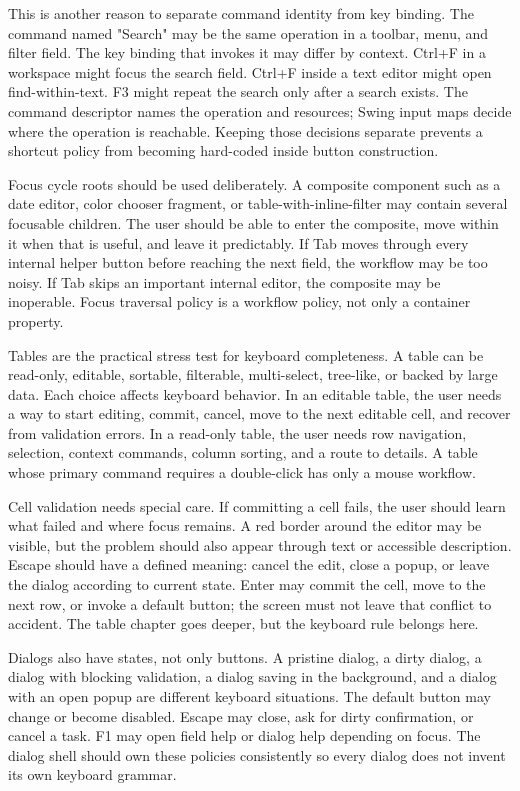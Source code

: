 This is another reason to separate command identity from key binding. The
command named "Search" may be the same operation in a toolbar, menu, and filter
field. The key binding that invokes it may differ by context. Ctrl+F in a
workspace might focus the search field. Ctrl+F inside a text editor might open
find-within-text. F3 might repeat the search only after a search exists. The
command descriptor names the operation and resources; Swing input maps decide
where the operation is reachable. Keeping those decisions separate prevents a
shortcut policy from becoming hard-coded inside button construction.

Focus cycle roots should be used deliberately. A composite component such as a
date editor, color chooser fragment, or table-with-inline-filter may contain
several focusable children. The user should be able to enter the composite, move
within it when that is useful, and leave it predictably. If Tab moves through
every internal helper button before reaching the next field, the workflow may be
too noisy. If Tab skips an important internal editor, the composite may be
inoperable. Focus traversal policy is a workflow policy, not only a container
property.

Tables are the practical stress test for keyboard completeness. A table can be
read-only, editable, sortable, filterable, multi-select, tree-like, or backed by
large data. Each choice affects keyboard behavior. In an editable table, the
user needs a way to start editing, commit, cancel, move to the next editable
cell, and recover from validation errors. In a read-only table, the user needs
row navigation, selection, context commands, column sorting, and a route to
details. A table whose primary command requires a double-click has only a mouse
workflow.

Cell validation needs special care. If committing a cell fails, the user should
learn what failed and where focus remains. A red border around the editor may be
visible, but the problem should also appear through text or accessible
description. Escape should have a defined meaning: cancel the edit, close a
popup, or leave the dialog according to current state. Enter may commit the
cell, move to the next row, or invoke a default button; the screen must not
leave that conflict to accident. The table chapter goes deeper, but the
keyboard rule belongs here.

Dialogs also have states, not only buttons. A pristine dialog, a dirty dialog,
a dialog with blocking validation, a dialog saving in the background, and a
dialog with an open popup are different keyboard situations. The default button
may change or become disabled. Escape may close, ask for dirty confirmation, or
cancel a task. F1 may open field help or dialog help depending on focus. The
dialog shell should own these policies consistently so every dialog does not
invent its own keyboard grammar.

